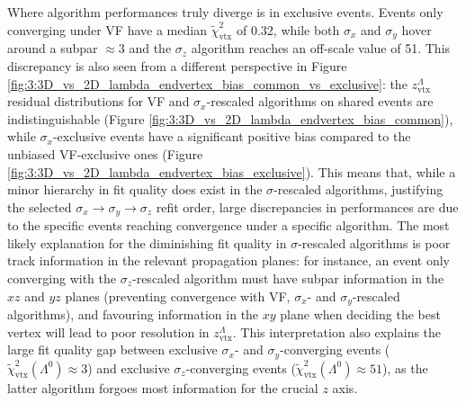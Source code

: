 Where algorithm performances truly diverge is in exclusive events.
Events only converging under VF have a median $\tilde{\chi}^2_\text{vtx}$ of 0.32, while both $\sigma_x$ and $\sigma_y$ hover around a subpar $\approx 3$ and the $\sigma_z$ algorithm reaches an off-scale value of 51.
This discrepancy is also seen from a different perspective in Figure \ref{fig:3:3D_vs_2D_lambda_endvertex_bias_common_vs_exclusive}: the $z_\text{vtx}^\Lambda$ residual distributions for VF and $\sigma_x$-rescaled algorithms on shared events are indistinguishable (Figure \ref{fig:3:3D_vs_2D_lambda_endvertex_bias_common}), while $\sigma_x$-exclusive events have a significant positive bias compared to the unbiased VF-exclusive ones (Figure \ref{fig:3:3D_vs_2D_lambda_endvertex_bias_exclusive}).
This means that, while a minor hierarchy in fit quality does exist in the $\sigma$-rescaled algorithms, justifying the selected $\sigma_x \rightarrow \sigma_y \rightarrow \sigma_z$ refit order, large discrepancies in performances are due to the specific events reaching convergence under a specific algorithm.
The most likely explanation for the diminishing fit quality in $\sigma$-rescaled algorithms is poor track information in the relevant propagation planes:
for instance, an event only converging with the $\sigma_z$-rescaled algorithm must have subpar information in the $xz$ and $yz$ planes (preventing convergence with VF, $\sigma_x$- and $\sigma_y$-rescaled algorithms), and favouring information in the $xy$ plane when deciding the best vertex will lead to poor resolution in $z_\text{vtx}^\Lambda$.
This interpretation also explains the large fit quality gap between exclusive $\sigma_x$- and $\sigma_y$-converging events ($\tilde{\chi}^2_\text{vtx} (\Lambda^0) \approx 3$) and exclusive $\sigma_z$-converging events ($\tilde{\chi}^2_\text{vtx} (\Lambda^0) \approx 51$), as the latter algorithm forgoes most information for the crucial $z$ axis.

